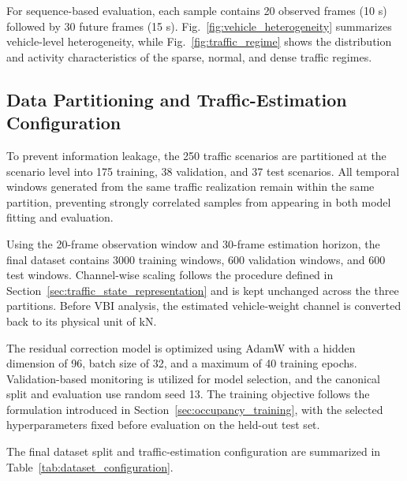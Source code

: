 \documentclass[journal]{IEEEtran}
\begin{document}
For sequence-based evaluation, each sample contains 20 observed frames (10 s) followed by 30 future frames (15 s). Fig.~\ref{fig:vehicle_heterogeneity} summarizes vehicle-level heterogeneity, while Fig.~\ref{fig:traffic_regime} shows the distribution and activity characteristics of the sparse, normal, and dense traffic regimes.

\subsection{Data Partitioning and Traffic-Estimation Configuration}

To prevent information leakage, the 250 traffic scenarios are partitioned at the scenario level into 175 training, 38 validation, and 37 test scenarios. All temporal windows generated from the same traffic realization remain within the same partition, preventing strongly correlated samples from appearing in both model fitting and evaluation.

Using the 20-frame observation window and 30-frame estimation horizon, the final dataset contains 3000 training windows, 600 validation windows, and 600 test windows. Channel-wise scaling follows the procedure defined in Section~\ref{sec:traffic_state_representation} and is kept unchanged across the three partitions. Before VBI analysis, the estimated vehicle-weight channel is converted back to its physical unit of kN.

The residual correction model is optimized using AdamW with a hidden dimension of 96, batch size of 32, and a maximum of 40 training epochs. Validation-based monitoring is utilized for model selection, and the canonical split and evaluation use random seed 13. The training objective follows the formulation introduced in Section~\ref{sec:occupancy_training}, with the selected hyperparameters fixed before evaluation on the held-out test set.

The final dataset split and traffic-estimation configuration are summarized in Table~\ref{tab:dataset_configuration}.
\end{document}
